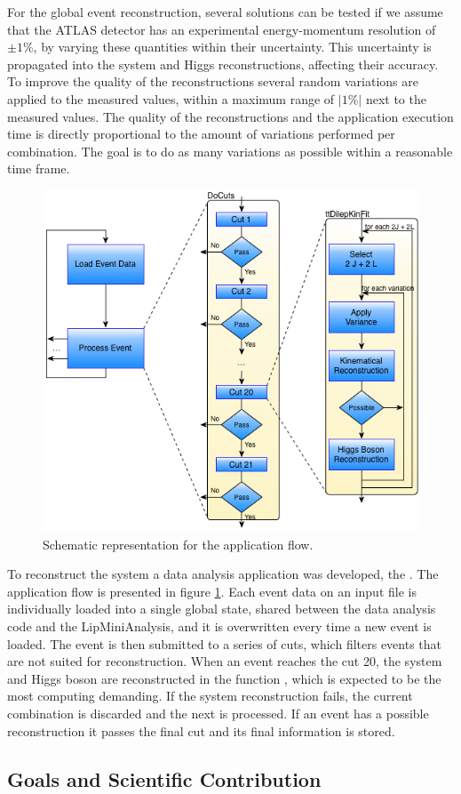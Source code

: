 For the global event reconstruction, several solutions can be tested if we assume that the ATLAS detector has an experimental energy-momentum resolution of $\pm1\%$, by varying these quantities within their uncertainty. This uncertainty is propagated into the \ttbar system and Higgs reconstructions, affecting their accuracy. To improve the quality of the reconstructions several random variations are applied to the measured values, within a maximum range of $|1\%|$ next to the measured values. The quality of the reconstructions and the application execution time is directly proportional to the amount of variations performed per combination. The goal is to do as many variations as possible within a reasonable time frame.

\begin{figure}[!htp]
	\begin{center}
		\includegraphics[scale=0.5]{imgs/graf_abstract_flow_with_kinfit.png}
		\caption{Schematic representation for the \tth application flow.}
		\label{fig:flow}
	\end{center}
\end{figure}

To reconstruct the \ttH system a data analysis application was developed, the \tth. The application flow is presented in figure \ref{fig:flow}. Each event data on an input file is individually loaded into a single global state, shared between the data analysis code and the LipMiniAnalysis, and it is overwritten every time a new event is loaded. The event is then submitted to a series of cuts, which filters events that are not suited for reconstruction. When an event reaches the cut 20, the \ttbar system and Higgs boson are reconstructed in the function \ttDilepKinFit, which is expected to be the most computing demanding. If the \ttbar system reconstruction fails, the current combination is discarded and the next is processed. If an event has a possible reconstruction it passes the final cut and its final information is stored.

\subsection{Goals and Scientific Contribution}
\label{goals}




